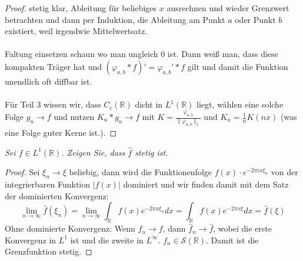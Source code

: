 \documentclass[11pt]{article}
\newcommand{\R}{\mathbb{R}}
\newenvironment{problem}[2][Beispiel]{
    \begin{trivlist}
        \item[\hskip \labelsep {\bfseries #1}\hskip \labelsep {\bfseries #2.}] \itshape}{
    \end{trivlist}\normalshape
}
\begin{document}
    \begin{proof}
        stetig klar, Ableitung für beliebiges $x$ ausrechnen und wieder
        Grenzwert betrachten und dann per Induktion, die Ableitung am
        Punkt $a$ oder Punkt $b$ existiert, weil irgendwie
        Mittelwertsatz.\\\\
        Faltung einsetzen schaun wo man ungleich $0$ ist. Dann weiß man,
        dass diese kompakten Träger hat und $(\varphi_{a,b}*f)'=\varphi_{a,b}'*f$
        gilt und damit die Funktion unendlich oft diffbar ist. \\\\
        Für Teil 3 wissen wir, dass $C_c(\R)$ dicht in $L^1(\R)$ liegt, wählen
        eine solche Folge $g_{n}\to f$ und nutzen
        $K_n*g_n\to f$ mit $K = \frac{\varphi_{a,b}}{\|\varphi_{a,b}\|_1}$
        und $K_n = \frac{1}{n}K(nx)$ (was eine Folge guter Kerne ist.).
    \end{proof}

    \begin{problem}{4}
        Sei $f \in L^1(\mathbb{R})$. Zeigen Sie, dass $\hat{f}$ stetig ist.
    \end{problem}

    \begin{proof}
        Sei $\xi_n \to\xi$ beliebig, dann wird die Funktionenfolge $f(x)\cdot e^{-2\pi ix\xi_n}$ von
        der integrierbaren Funktion $|f(x)|$ dominiert und wir finden damit mit dem Satz der
        dominierten Konvergenz:
        $$\lim_{n\to\infty}\hat{f}(\xi_n)=\lim_{n\to\infty}\int_{\R} f(x) e^{-2\pi x\xi_n} dx =
        \int_{\R} f(x) e^{-2\pi x\xi} dx= \hat{f}(\xi)$$
        Ohne dominierte Konvergenz: Wenn $f_n\to f$, dann $\hat{f}_n\to\hat{f}$,
        wobei die erste Konvergenz in $L^1$ ist und die zweite in $L^\infty$.
        $f_n\in\mathcal{S}(\R)$.
        Damit ist die Grenzfunktion stetig.
    \end{proof}
\end{document}
